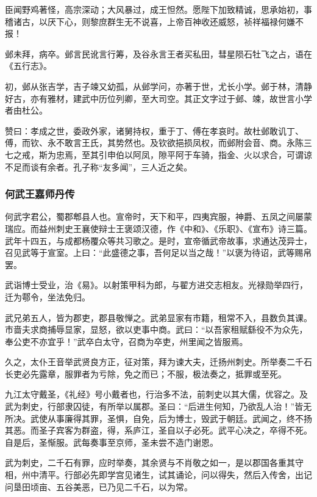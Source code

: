 \documentclass[]{article}
\begin{document}
臣闻野鸡著怪，高宗深动；大风暴过，成王怛然。愿陛下加致精诚，思承始初，事稽诸古，以厌下心，则黎庶群生无不说喜，上帝百神收还威怒，祯祥福禄何嫌不报！

邺未拜，病卒。邺言民讹言行筹，及谷永言王者买私田，彗星陨石牡飞之占，语在《五行志》。

初，邺从张吉学，吉子竦又幼孤，从邺学问，亦著于世，尤长小学。邺于林，清静好古，亦有雅材，建武中历位列卿，至大司空。其正文字过于邺、竦，故世言小学者由杜公。

赞曰：孝成之世，委政外家，诸舅持权，重于丁、傅在孝哀时。故杜邺敢讥丁、傅，而钦、永不敢言王氏，其势然也。及钦欲挹损凤权，而邺附会音、商。永陈三七之戒，斯为忠焉，至其引申伯以阿凤，隙平阿于车骑，指金、火以求合，可谓谅不足而谈有余者。孔子称``友多闻''，三人近之矣。

\hypertarget{header-n5814}{%
\subsubsection{何武王嘉师丹传}\label{header-n5814}}

何武字君公，蜀郡郫县人也。宣帝时，天下和平，四夷宾服，神爵、五凤之间屡蒙瑞应。而益州刺史王襄使辩士王褒颂汉德，作《中和》、《乐职》、《宣布》诗三篇。武年十四五，与成都杨覆众等共习歌之。是时，宣帝循武帝故事，求通达茂异士，召见武等于宣室。上曰：``此盛德之事，吾何足以当之哉！''以褒为待诏，武等赐帛罢。

武诣博士受业，治《易》。以射策甲科为郎，与翟方进交志相友。光禄勋举四行，迁为鄠令，坐法免归。

武兄弟五人，皆为郡吏，郡县敬惮之。武弟显家有市籍，租常不入，县数负其课。市啬夫求商捕辱显家，显怒，欲以吏事中商。武曰：``以吾家租赋繇役不为众先，奉公吏不亦宜乎！''武卒白太守，召商为卒吏，州里闻之皆服焉。

久之，太仆王音举武贤良方正，征对策，拜为谏大夫，迁扬州刺史。所举奏二千石长吏必先露章，服罪者为亏除，免之而已；不服，极法奏之，抵罪或至死。

九江太守戴圣，《礼经》号小戴者也，行治多不法，前刺史以其大儒，优容之。及武为刺史，行部隶囚徒，有所举以属郡。圣曰：``后进生何知，乃欲乱人治！''皆无所决。武使从事廉得其罪，圣惧，自免，后为博士，毁武于朝廷。武闻之，终不扬其恶。而圣子宾客为群盗，得，系庐江，圣自以子必死。武平心决之，卒得不死。自是后，圣惭服。武每奏事至京师，圣未尝不造门谢恩。

武为刺史，二千石有罪，应时举奏，其余贤与不肖敬之如一，是以郡国各重其守相，州中清平。行部必先即学宫见诸生，试其诵论，问以得失，然后入传舍，出记问垦田顷亩、五谷美恶，已乃见二千石，以为常。
\end{document}
